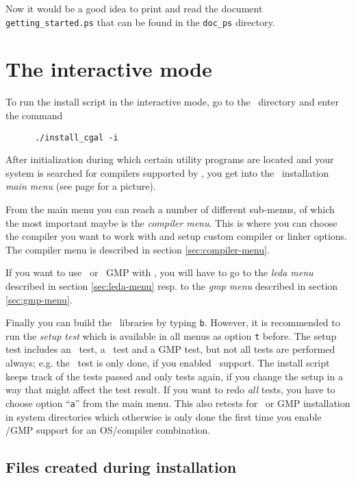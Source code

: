 Now it would be a good idea to print and read the document
\texttt{getting\_started.ps} that can be found in the \texttt{doc\_ps}
directory.

\section{The interactive mode}\label{sec:interactive-mode}

To run the install script in the interactive mode, go to the \cgaldir\ 
directory and enter the command
\begin{verbatim}
      ./install_cgal -i
\end{verbatim}

After initialization during which certain utility programs are located
and your system is searched for compilers supported by \cgal, you get
into the \cgal\ installation \textit{main menu} (see page
\pageref{pic:main-menu} for a picture).

From the main menu you can reach a number of different sub-menus, of
which the most important maybe is the \textit{compiler menu}. This is
where you can choose the compiler you want to work with and setup
custom compiler or linker options.  The compiler menu is described in
section \ref{sec:compiler-menu}.

If you want to use \leda\ or \gnu\ GMP with \cgal, you will have to go
to the \textit{leda menu} described in section \ref{sec:leda-menu}
resp.  to the \textit{gmp menu} described in section
\ref{sec:gmp-menu}.

Finally you can build the \cgal\ libraries by typing \texttt{b}.
However, it is recommended to run the \textit{setup test} which is
available in all menus as option \texttt{t} before. The setup test
includes an \stl\ test, a \leda\ test and a GMP test, but not all
tests are performed always; e.g. the \leda\ test is only done, if you
enabled \leda\ support. The install script keeps track of the tests
passed and only tests again, if you change the setup in a way that
might affect the test result. If you want to redo \textit{all} tests,
you have to choose option ``\texttt{a}'' from the main menu. This also
retests for \leda\ or GMP installation in system directories which
otherwise is only done the first time you enable \leda/GMP support for
an OS/compiler combination.

\subsection{Files created during installation}

